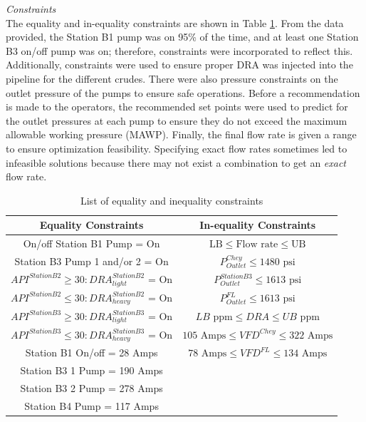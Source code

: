 \noindent
\textit{Constraints} \\
The equality and in-equality constraints are shown in Table \ref{tab:08eq_neq_constraints}. From the data provided, the Station B1 pump was on 95\% of the time, and at least one Station B3 on/off pump was on; therefore, constraints were incorporated to reflect this.  Additionally, constraints were used to ensure proper DRA was injected into the pipeline for the different crudes.  There were also pressure constraints on the outlet pressure of the pumps to ensure safe operations.  Before a recommendation is made to the operators, the recommended set points were used to predict for the outlet pressures at each pump to ensure they do not exceed the maximum allowable working pressure (MAWP). Finally, the final flow rate is given a range to ensure optimization feasibility. Specifying exact flow rates sometimes led to infeasible solutions because there may not exist a combination to get an \textit{exact} flow rate.

\begin{table}[h]
    \centering
    {
    \begin{tabular}{c|c}
         Equality Constraints              & In-equality Constraints \\
         \hline
         On/off Station B1 Pump = On         & $\text{LB} \leq \text{Flow rate} \leq \text{UB}$ \\
         
         Station B3 Pump 1 and/or 2 = On          & $P_{Outlet}^{Chey} \leq 1480 \text{ psi}$       \\
         
         $API^{Station B2} \geq 30: DRA_{light}^{Station B2}$ = On & $P_{Outlet}^{Station B3} \leq 1613 \text{ psi}$ \\
         
         $API^{Station B2} \leq 30: DRA_{heavy}^{Station B2}$ = On  & $P_{Outlet}^{FL} \leq 1613 \text{ psi}$  \\
         
         $API^{Station B3} \geq 30: DRA_{light}^{Station B3}$ = On & $LB \text{ ppm} \leq DRA \leq UB \text{ ppm}$                 \\
         
         $API^{Station B3} \leq 30: DRA_{heavy}^{Station B3}$  = On  & $105 \text{ Amps} \leq VFD^{Chey} \leq 322 \text{ Amps}$   \\
         
         Station B1 On/off = 28 Amps  & $78 \text{ Amps} \leq VFD^{FL} \leq 134 \text{ Amps}$  \\
         Station B3 1 Pump = 190 Amps & \\
         Station B3 2 Pump = 278 Amps & \\
         Station B4 Pump = 117 Amps & \\
    \end{tabular}}   
    \caption{List of equality and inequality constraints}
    \label{tab:08eq_neq_constraints}
\end{table}

